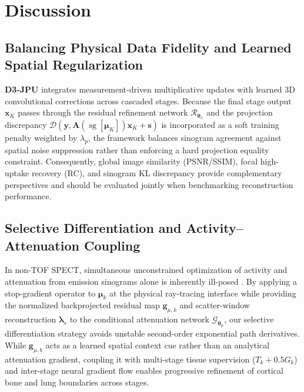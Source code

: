 \documentclass[11pt, a4paper]{article}
\begin{document}
\section{Discussion}

\subsection{Balancing Physical Data Fidelity and Learned Spatial Regularization}
\textbf{D3-JPU} integrates measurement-driven multiplicative updates with learned 3D convolutional corrections across cascaded stages. Because the final stage output $\mathbf{x}_K$ passes through the residual refinement network $\mathcal{R}_{\boldsymbol{\theta}_x}$ and the projection discrepancy $\mathcal{D}(\mathbf{y}, \mathbf{A}(\operatorname{sg}[\boldsymbol{\mu}_K])\mathbf{x}_K + \mathbf{s})$ is incorporated as a soft training penalty weighted by $\lambda_p$, the framework balances sinogram agreement against spatial noise suppression rather than enforcing a hard projection equality constraint. Consequently, global image similarity (PSNR/SSIM), focal high-uptake recovery (RC), and sinogram KL discrepancy provide complementary perspectives and should be evaluated jointly when benchmarking reconstruction performance.

\subsection{Selective Differentiation and Activity--Attenuation Coupling}
In non-TOF SPECT, simultaneous unconstrained optimization of activity and attenuation from emission sinograms alone is inherently ill-posed \cite{ref12, ref16}. By applying a stop-gradient operator to $\boldsymbol{\mu}_k$ at the physical ray-tracing interface while providing the normalized backprojected residual map $\mathbf{g}_{\mu,k}$ and scatter-window reconstruction $\boldsymbol{\lambda}_s$ to the conditional attenuation network $\mathcal{G}_{\boldsymbol{\theta}_\mu}$, our selective differentiation strategy avoids unstable second-order exponential path derivatives. While $\mathbf{g}_{\mu,k}$ acts as a learned spatial context cue rather than an analytical attenuation gradient, coupling it with multi-stage tissue supervision ($T_k + 0.5 G_k$) and inter-stage neural gradient flow enables progressive refinement of cortical bone and lung boundaries across stages.
\end{document}
